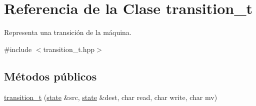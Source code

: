\hypertarget{classtransition__t}{}\section{Referencia de la Clase transition\+\_\+t}
\label{classtransition__t}


Representa una transición de la máquina.  




{\ttfamily \#include $<$transition\+\_\+t.\+hpp$>$}

\subsection*{Métodos públicos}
\begin{DoxyCompactItemize}
\item 
\hypertarget{classtransition__t_aa62ed346511c02704d794d05ff1a77ad}{}\hyperlink{classtransition__t_aa62ed346511c02704d794d05ff1a77ad}{transition\+\_\+t} (\hyperlink{classstate}{state} \&src, \hyperlink{classstate}{state} \&dest, char read, char write, char mv)\label{classtransition__t_aa62ed346511c02704d794d05ff1a77ad}


\end{DoxyCompactItemize}
